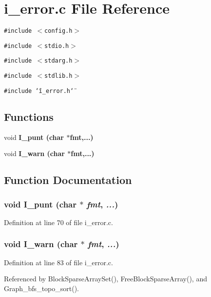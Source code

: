 \section{i\_\-error.c File Reference}
\label{i__error_8c}
{\tt \#include $<$config.h$>$}\par
{\tt \#include $<$stdio.h$>$}\par
{\tt \#include $<$stdarg.h$>$}\par
{\tt \#include $<$stdlib.h$>$}\par
{\tt \#include \char`\"{}i\_\-error.h\char`\"{}}\par
\subsection*{Functions}
\begin{CompactItemize}
\item 
void \bf{I\_\-punt} (char $\ast$fmt,...)
\item 
void \bf{I\_\-warn} (char $\ast$fmt,...)
\end{CompactItemize}


\subsection{Function Documentation}
\subsubsection{\setlength{\rightskip}{0pt plus 5cm}void I\_\-punt (char $\ast$ {\em fmt},  {\em ...})}\label{i__error_8c_04f215f17936ffe11d70fef75a9f2185}




Definition at line 70 of file i\_\-error.c.
\subsubsection{\setlength{\rightskip}{0pt plus 5cm}void I\_\-warn (char $\ast$ {\em fmt},  {\em ...})}\label{i__error_8c_c0138045492af6457622579cfe270c7f}




Definition at line 83 of file i\_\-error.c.

Referenced by Block\-Sparse\-Array\-Set(), Free\-Block\-Sparse\-Array(), and Graph\_\-bfs\_\-topo\_\-sort().